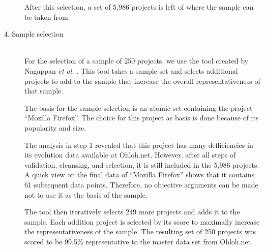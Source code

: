 \begin{description}
	After this selection, a set of 5,986 projects is left of where the sample can
	be taken from.
	
	\item[4. Sample selection] \hfill \\ For the selection of a sample of 250
	projects, we use the tool created by Nagappan \emph{et al. }\rm\cite{nagappan}.
	This tool takes a sample set and selects additional projects to add to the
	sample that increase the overall representativeness of that sample.
	
	The basis for the sample selection is an atomic set containing the
	project ``Mozilla Firefox''. The choice for this project as basis is done
	because of its popularity and size.
	
	The analysis in step 1 revealed that this project has many defficiencies in
	its evolution data available at Ohloh.net. However, after all steps of
	validation, cleansing, and selection, it is still included in the 5,986
	projects. A quick view on the final data of ``Mozilla Firefox'' shows that it
	contains 61 subsequent data points. Therefore, no objective arguments can be
	made not to use it as the basis of the sample.
	
	The tool then iteratively selects 249 more projects and adds it to the sample.
	Each addition project is selected by its score to maximally increase the
	representativeness of the sample. The resulting set of 250 projects was scored
	to be 99.5\% representative to the master data set from Ohloh.net.
\end{description}

